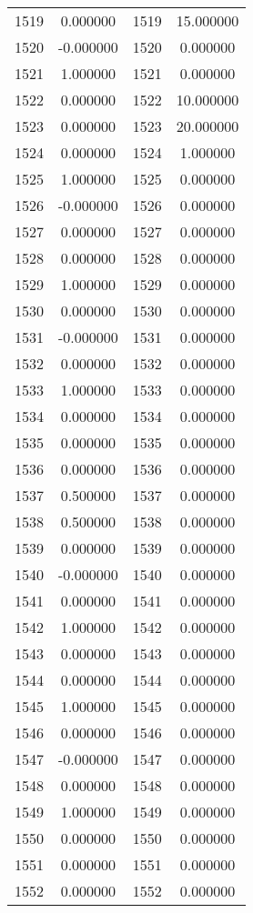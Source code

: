 \documentclass[12pt]{article}
\begin{document}
\begin{longtable}{@{}cccc@{}}
1519 & 0.000000 & 1519 & 15.000000 \\
1520 & -0.000000 & 1520 & 0.000000 \\
1521 & 1.000000 & 1521 & 0.000000 \\
1522 & 0.000000 & 1522 & 10.000000 \\
1523 & 0.000000 & 1523 & 20.000000 \\
1524 & 0.000000 & 1524 & 1.000000 \\
1525 & 1.000000 & 1525 & 0.000000 \\
1526 & -0.000000 & 1526 & 0.000000 \\
1527 & 0.000000 & 1527 & 0.000000 \\
1528 & 0.000000 & 1528 & 0.000000 \\
1529 & 1.000000 & 1529 & 0.000000 \\
1530 & 0.000000 & 1530 & 0.000000 \\
1531 & -0.000000 & 1531 & 0.000000 \\
1532 & 0.000000 & 1532 & 0.000000 \\
1533 & 1.000000 & 1533 & 0.000000 \\
1534 & 0.000000 & 1534 & 0.000000 \\
1535 & 0.000000 & 1535 & 0.000000 \\
1536 & 0.000000 & 1536 & 0.000000 \\
1537 & 0.500000 & 1537 & 0.000000 \\
1538 & 0.500000 & 1538 & 0.000000 \\
1539 & 0.000000 & 1539 & 0.000000 \\
1540 & -0.000000 & 1540 & 0.000000 \\
1541 & 0.000000 & 1541 & 0.000000 \\
1542 & 1.000000 & 1542 & 0.000000 \\
1543 & 0.000000 & 1543 & 0.000000 \\
1544 & 0.000000 & 1544 & 0.000000 \\
1545 & 1.000000 & 1545 & 0.000000 \\
1546 & 0.000000 & 1546 & 0.000000 \\
1547 & -0.000000 & 1547 & 0.000000 \\
1548 & 0.000000 & 1548 & 0.000000 \\
1549 & 1.000000 & 1549 & 0.000000 \\
1550 & 0.000000 & 1550 & 0.000000 \\
1551 & 0.000000 & 1551 & 0.000000 \\
1552 & 0.000000 & 1552 & 0.000000 \\

\end{longtable}
\end{document}
